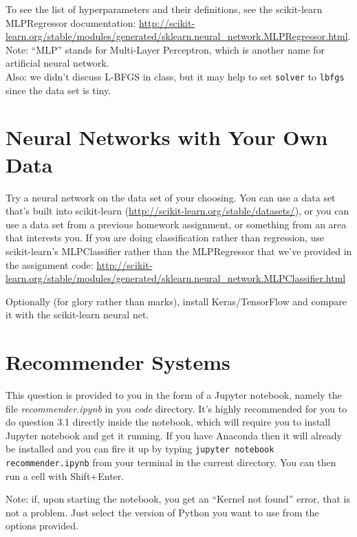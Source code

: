 \documentclass{article}
\begin{document}
To see the list of hyperparameters and their definitions, see the scikit-learn MLPRegressor documentation:
\url{http://scikit-learn.org/stable/modules/generated/sklearn.neural_network.MLPRegressor.html}. Note: ``MLP'' stands for Multi-Layer Perceptron, 
which is another name for artificial neural network.\\
Also: we didn't discuss L-BFGS in class, but it may help to set \verb|solver| to \verb|lbfgs| since the data set is tiny.




\section{Neural Networks with Your Own Data}

Try a neural network on the data set of your choosing. 
You can use a data set that's built into scikit-learn
(\url{http://scikit-learn.org/stable/datasets/}), or you can use a data set from a previous homework assignment, or something from an area that interests you. 
If you are doing classification rather than regression, use scikit-learn's MLPClassifier rather than the MLPRegressor that we've provided in the assignment code: \url{http://scikit-learn.org/stable/modules/generated/sklearn.neural_network.MLPClassifier.html}


 Optionally (for glory rather than marks), install Keras/TensorFlow and compare it with
the scikit-learn neural net. 


\section{Recommender Systems}

This question is provided to you in the form of a Jupyter notebook, namely the file 
\emph{recommender.ipynb} in you \emph{code} directory. 
It's highly recommended for you to do 
question 3.1 directly inside the notebook, which will require
you to install Jupyter notebook and get it running. If you have Anaconda then
it will already be installed and you can fire it up by typing 
\verb|jupyter notebook recommender.ipynb|
from your terminal in the current directory. You can then run a cell with Shift+Enter. 

Note: if, upon starting the notebook, you get an ``Kernel not found'' error,
that is not a problem. Just select the version of Python you want to use from
the options provided.
\end{document}
